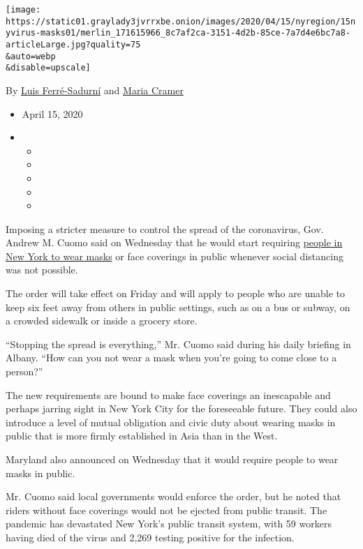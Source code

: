\texttt{[image: https://static01.graylady3jvrrxbe.onion/images/2020/04/15/nyregion/15nyvirus-masks01/merlin\_171615966\_8c7af2ca-3151-4d2b-85ce-7a7d4e6bc7a8-articleLarge.jpg?quality=75\\\&auto=webp\\\&disable=upscale]}

By \href{https://www.nytimes3xbfgragh.onion/by/luis-ferre-sadurni}{Luis
Ferré-Sadurní} and
\href{https://www.nytimes3xbfgragh.onion/by/maria-cramer}{Maria Cramer}

\begin{itemize}
\item
  April 15, 2020
\item
  \begin{itemize}
  \item
  \item
  \item
  \item
  \item
  \end{itemize}
\end{itemize}

Imposing a stricter measure to control the spread of the coronavirus,
Gov. Andrew M. Cuomo said on Wednesday that he would start requiring
\href{https://www.nytimes3xbfgragh.onion/2020/06/11/nyregion/nypd-face-masks-nyc-protests.html}{people
in New York to wear masks} or face coverings in public whenever social
distancing was not possible.

The order will take effect on Friday and will apply to people who are
unable to keep six feet away from others in public settings, such as on
a bus or subway, on a crowded sidewalk or inside a grocery store.

``Stopping the spread is everything,'' Mr. Cuomo said during his daily
briefing in Albany. ``How can you not wear a mask when you're going to
come close to a person?''

The new requirements are bound to make face coverings an inescapable and
perhaps jarring sight in New York City for the foreseeable future. They
could also introduce a level of mutual obligation and civic duty about
wearing masks in public that is more firmly established in Asia than in
the West.

Maryland also announced on Wednesday that it would require people to
wear masks in public.

Mr. Cuomo said local governments would enforce the order, but he noted
that riders without face coverings would not be ejected from public
transit. The pandemic has devastated New York's public transit system,
with 59 workers having died of the virus and 2,269 testing positive for
the infection.

